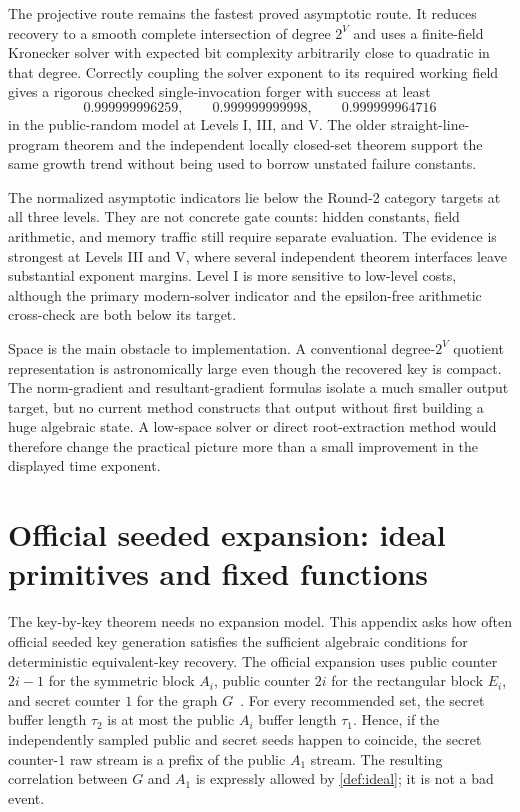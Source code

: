 \documentclass[11pt,a4paper]{article}
\theoremstyle{definition}
\theoremstyle{remark}
\begin{document}
The projective route remains the fastest proved asymptotic route.  It reduces recovery to a smooth complete intersection of degree $2^V$ and uses a finite-field Kronecker solver with expected bit complexity arbitrarily close to quadratic in that degree.  Correctly coupling the solver exponent to its required working field gives a rigorous checked single-invocation forger with success at least
\[
0.999999996259,\qquad0.999999999998,\qquad0.999999964716
\]
in the public-random model at Levels I, III, and V.  The older straight-line-program theorem and the independent locally closed-set theorem support the same growth trend without being used to borrow unstated failure constants.

The normalized asymptotic indicators lie below the Round-2 category targets at all three levels.  They are not concrete gate counts: hidden constants, field arithmetic, and memory traffic still require separate evaluation.  The evidence is strongest at Levels III and V, where several independent theorem interfaces leave substantial exponent margins.  Level I is more sensitive to low-level costs, although the primary modern-solver indicator and the epsilon-free arithmetic cross-check are both below its target.

Space is the main obstacle to implementation.  A conventional degree-$2^V$ quotient representation is astronomically large even though the recovered key is compact.  The norm-gradient and resultant-gradient formulas isolate a much smaller output target, but no current method constructs that output without first building a huge algebraic state.  A low-space solver or direct root-extraction method would therefore change the practical picture more than a small improvement in the displayed time exponent.

\appendix

\section{Official seeded expansion: ideal primitives and fixed functions}\label{app:seeded-transfer}

The key-by-key theorem needs no expansion model.  This appendix asks how often official seeded key generation satisfies the sufficient algebraic conditions for deterministic equivalent-key recovery.  The official expansion uses public counter $2i-1$ for the symmetric block $A_i$, public counter $2i$ for the rectangular block $E_i$, and secret counter $1$ for the graph $G$~\cite[Secs.~4.7--4.10]{QRUOVSpec}.  For every recommended set, the secret buffer length $\tau_2$ is at most the public $A_i$ buffer length $\tau_1$.  Hence, if the independently sampled public and secret seeds happen to coincide, the secret counter-$1$ raw stream is a prefix of the public $A_1$ stream.  The resulting correlation between $G$ and $A_1$ is expressly allowed by \cref{def:ideal}; it is not a bad event.
\end{document}
